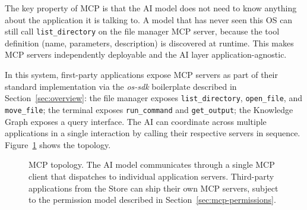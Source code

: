 The key property of MCP is that the AI model does not need to know anything
about the application it is talking to. A model that has never seen this OS
can still call \texttt{list\_directory} on the file manager MCP server,
because the tool definition (name, parameters, description) is discovered at
runtime. This makes MCP servers independently deployable and the AI layer
application-agnostic.

In this system, first-party applications expose MCP servers as part of their
standard implementation via the \emph{os-sdk} boilerplate described in
Section~\ref{sec:overview}: the file manager exposes \texttt{list\_directory},
\texttt{open\_file}, and \texttt{move\_file}; the terminal exposes
\texttt{run\_command} and \texttt{get\_output}; the Knowledge Graph exposes a
query interface. The AI can coordinate across multiple applications in a single
interaction by calling their respective servers in sequence.
Figure~\ref{fig:mcp} shows the topology.

\begin{figure}[htbp]
	\centering


\caption{MCP topology. The AI model communicates through a single MCP client
that dispatches to individual application servers. Third-party applications
from the Store can ship their own MCP servers, subject to the permission model
described in Section~\ref{sec:mcp-permissions}.}
\label{fig:mcp}
\end{figure}

